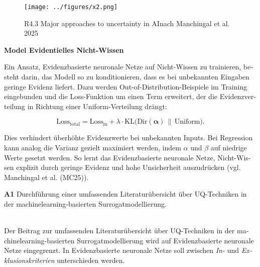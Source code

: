 \begin{otherlanguage}{ngerman}
\begin{figure}[!ht]
  \centering
  \texttt{[image: ../figures/x2.png]}
  \caption{R4.3 \glqq Major approaches to uncertainty in AI\grqq nach Manchingal et al. 2025}
\end{figure}



\textbf{Model Evidentielles Nicht-Wissen}

Ein Ansatz, \gls{Evidenzbasierte neuronale Netze} auf Nicht-Wissen zu trainieren, besteht darin, das Modell so zu konditionieren, dass es bei unbekannten Eingaben geringe Evidenz liefert. Dazu werden \gls{Out-of-Distribution}-Beispiele im Training eingebunden und die Loss-Funktion um einen Term erweitert, der die Evidenzverteilung in Richtung einer Uniform-Verteilung drängt:

\begin{equation}
\text{Loss}_{\text{total}} 
= \text{Loss}_{\text{in}} 
+ \lambda \cdot \text{KL}\bigl(\text{Dir}(\boldsymbol{\alpha}) \,\|\, \text{Uniform}\bigr).
\end{equation}

Dies verhindert überhöhte Evidenzwerte bei unbekannten Inputs. Bei Regression kann analog die Varianz gezielt maximiert werden, indem $\alpha$ und $\beta$ auf niedrige Werte gesetzt werden. So lernt das \gls{Evidenzbasierte neuronale Netze}, Nicht-Wissen explizit durch geringe Evidenz und hohe Unsicherheit auszudrücken (vgl. Manchingal et al. (MC25)).



\pagebreak


\textbf{A1} Durchführung einer umfassenden Literaturübersicht über UQ-Techniken in der \gls{machinelearning}-basierten Surrogatmodellierung.
\par\noindent\\

Der Beitrag zur umfassenden Literaturübersicht über UQ-Techniken in der \gls{machinelearning}-basierten Surrogatmodellierung wird auf \gls{Evidenzbasierte neuronale Netze} eingegrenzt. In \gls{Evidenzbasierte neuronale Netze} soll zwischen \textit{In-} und \textit{Exklusionskriterien} unterschieden werden.


\end{otherlanguage}
